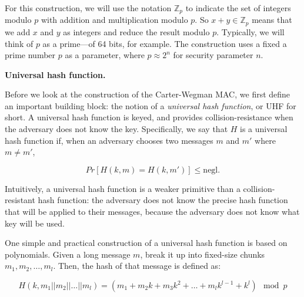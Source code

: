 \documentclass[
  letterpaper,
]{scrbook}
\newcommand{\Z}{\mathbb{Z}}
\theoremstyle{definition}
\theoremstyle{plain}
\theoremstyle{plain}
\theoremstyle{remark}
\begin{document}
For this construction, we will use the notation \(\Z_p\) to indicate the
set of integers modulo \(p\) with addition and multiplication modulo
\(p\). So \(x + y \in \Z_p\) means that we add \(x\) and \(y\) as
integers and reduce the result modulo \(p\). Typically, we will think of
\(p\) as a prime---of 64 bits, for example. The construction uses a
fixed a prime number \(p\) as a parameter, where \(p \approx 2^n\) for
security parameter \(n\).


\textbf{Universal hash function.}

Before we look at the construction of the Carter-Wegman MAC, we first
define an important building block: the notion of a \emph{universal hash
function}, or UHF for short. A universal hash function is keyed, and
provides collision-resistance when the adversary does not know the key.
Specifically, we say that \(H\) is a universal hash function if, when an
adversary chooses two messages \(m\) and \(m'\) where \(m\neq m'\),

\[
Pr[H(k, m) = H(k, m')] \leq \text{negl.}
\]

Intuitively, a universal hash function is a weaker primitive than a
collision-resistant hash function: the adversary does not know the
precise hash function that will be applied to their messages, because
the adversary does not know what key will be used.

One simple and practical construction of a universal hash function is
based on polynomials. Given a long message \(m\), break it up into
fixed-size chunks \(m_1, m_2, \ldots, m_{l}\). Then, the hash of that
message is defined as:


\[
H(k, m_1 || m_2 || \ldots || m_{l}) = (m_1 + m_2 k + m_3 k^2 +
  \ldots + m_{l} k^{l-1} + k^{l}) \mod p
\]

\end{document}
